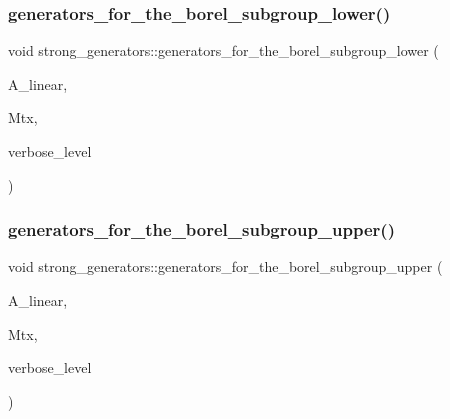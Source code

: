\mbox{\label{classstrong__generators_acdadd5e5c979289f36fdaaf6a96d6243}} 
\subsubsection{\texorpdfstring{generators\+\_\+for\+\_\+the\+\_\+borel\+\_\+subgroup\+\_\+lower()}{generators\_for\_the\_borel\_subgroup\_lower()}}
{\footnotesize\ttfamily void strong\+\_\+generators\+::generators\+\_\+for\+\_\+the\+\_\+borel\+\_\+subgroup\+\_\+lower (\begin{DoxyParamCaption}\item[{\mbox{\hyperlink{classaction}{action}} $\ast$}]{A\+\_\+linear,  }\item[{\mbox{\hyperlink{classmatrix__group}{matrix\+\_\+group}} $\ast$}]{Mtx,  }\item[{\mbox{\hyperlink{galois_8h_a09fddde158a3a20bd2dcadb609de11dc}{I\+NT}}}]{verbose\+\_\+level }\end{DoxyParamCaption})}

\mbox{\label{classstrong__generators_ad2b78850e421039116d2ba4bb4939729}} 
\subsubsection{\texorpdfstring{generators\+\_\+for\+\_\+the\+\_\+borel\+\_\+subgroup\+\_\+upper()}{generators\_for\_the\_borel\_subgroup\_upper()}}
{\footnotesize\ttfamily void strong\+\_\+generators\+::generators\+\_\+for\+\_\+the\+\_\+borel\+\_\+subgroup\+\_\+upper (\begin{DoxyParamCaption}\item[{\mbox{\hyperlink{classaction}{action}} $\ast$}]{A\+\_\+linear,  }\item[{\mbox{\hyperlink{classmatrix__group}{matrix\+\_\+group}} $\ast$}]{Mtx,  }\item[{\mbox{\hyperlink{galois_8h_a09fddde158a3a20bd2dcadb609de11dc}{I\+NT}}}]{verbose\+\_\+level }\end{DoxyParamCaption})}

